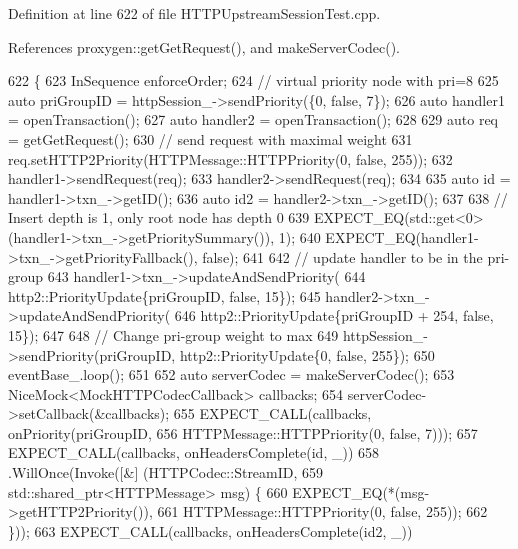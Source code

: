 Definition at line 622 of file H\+T\+T\+P\+Upstream\+Session\+Test.\+cpp.



References proxygen\+::get\+Get\+Request(), and make\+Server\+Codec().


\begin{DoxyCode}
622                                                \{
623   InSequence enforceOrder;
624   \textcolor{comment}{// virtual priority node with pri=8}
625   \textcolor{keyword}{auto} priGroupID = httpSession\_->sendPriority(\{0, \textcolor{keyword}{false}, 7\});
626   \textcolor{keyword}{auto} handler1 = openTransaction();
627   \textcolor{keyword}{auto} handler2 = openTransaction();
628 
629   \textcolor{keyword}{auto} req = getGetRequest();
630   \textcolor{comment}{// send request with maximal weight}
631   req.setHTTP2Priority(HTTPMessage::HTTPPriority(0, \textcolor{keyword}{false}, 255));
632   handler1->sendRequest(req);
633   handler2->sendRequest(req);
634 
635   \textcolor{keyword}{auto} \textcolor{keywordtype}{id} = handler1->txn\_->getID();
636   \textcolor{keyword}{auto} id2 = handler2->txn\_->getID();
637 
638   \textcolor{comment}{// Insert depth is 1, only root node has depth 0}
639   EXPECT\_EQ(std::get<0>(handler1->txn\_->getPrioritySummary()), 1);
640   EXPECT\_EQ(handler1->txn\_->getPriorityFallback(), \textcolor{keyword}{false});
641 
642   \textcolor{comment}{// update handler to be in the pri-group}
643   handler1->txn\_->updateAndSendPriority(
644     http2::PriorityUpdate\{priGroupID, \textcolor{keyword}{false}, 15\});
645   handler2->txn\_->updateAndSendPriority(
646     http2::PriorityUpdate\{priGroupID + 254, \textcolor{keyword}{false}, 15\});
647 
648   \textcolor{comment}{// Change pri-group weight to max}
649   httpSession\_->sendPriority(priGroupID, http2::PriorityUpdate\{0, \textcolor{keyword}{false}, 255\});
650   eventBase\_.loop();
651 
652   \textcolor{keyword}{auto} serverCodec = makeServerCodec();
653   NiceMock<MockHTTPCodecCallback> callbacks;
654   serverCodec->setCallback(&callbacks);
655   EXPECT\_CALL(callbacks, onPriority(priGroupID,
656                                     HTTPMessage::HTTPPriority(0, \textcolor{keyword}{false}, 7)));
657   EXPECT\_CALL(callbacks, onHeadersComplete(\textcolor{keywordtype}{id}, \_))
658     .WillOnce(Invoke([&] (HTTPCodec::StreamID,
659                           std::shared\_ptr<HTTPMessage> msg) \{
660           EXPECT\_EQ(*(msg->getHTTP2Priority()),
661                     HTTPMessage::HTTPPriority(0, \textcolor{keyword}{false}, 255));
662         \}));
663   EXPECT\_CALL(callbacks, onHeadersComplete(id2, \_))

\end{DoxyCode}
